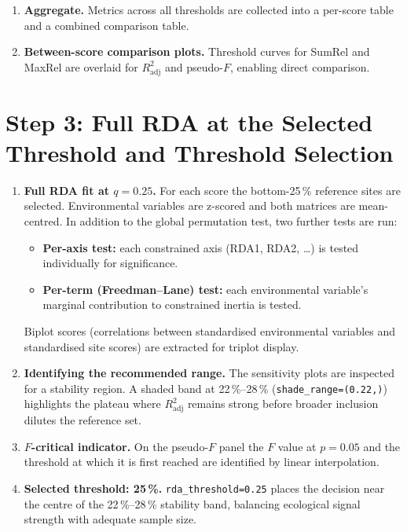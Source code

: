 \documentclass[11pt]{article}
\begin{document}
\begin{enumerate}[leftmargin=*]
\begin{enumerate}[label=(\alph*)]
      \item \textbf{Record metrics.}
        $R^2$, $R^2_{\mathrm{adj}}$, pseudo-$F$, $p$-value,
        constrained inertia, total inertia, RDA1 eigenvalue, $n$ sites.
    \end{enumerate}

  \item \textbf{Aggregate.}
    Metrics across all thresholds are collected into a per-score
    table and a combined comparison table.

  \item \textbf{Between-score comparison plots.}
    Threshold curves for SumRel and MaxRel are overlaid for
    $R^2_{\mathrm{adj}}$ and pseudo-$F$, enabling direct comparison.
\end{enumerate}

\section{Step 3: Full RDA at the Selected Threshold and
         Threshold Selection}

\begin{enumerate}[leftmargin=*]
  \item \textbf{Full RDA fit at $q = 0.25$.}
    For each score the bottom-25\,\% reference sites are selected.
    Environmental variables are z-scored and both matrices are
    mean-centred.
    In addition to the global permutation test, two further tests are
    run:
    \begin{itemize}
      \item \textbf{Per-axis test:} each constrained axis (RDA1, RDA2,
        \ldots) is tested individually for significance.
      \item \textbf{Per-term (Freedman--Lane) test:} each environmental
        variable's marginal contribution to constrained inertia is
        tested.
    \end{itemize}
    Biplot scores (correlations between standardised environmental
    variables and standardised site scores) are extracted for triplot
    display.

  \item \textbf{Identifying the recommended range.}
    The sensitivity plots are inspected for a stability region.
    A shaded band at 22\,\%--28\,\%
    (\texttt{shade\_range=(0.22,)}) highlights the plateau where
    $R^2_{\mathrm{adj}}$ remains strong before broader inclusion
    dilutes the reference set.

  \item \textbf{$F$-critical indicator.}
    On the pseudo-$F$ panel the $F$ value at $p = 0.05$ and the
    threshold at which it is first reached are identified by linear
    interpolation.

  \item \textbf{Selected threshold: 25\,\%.}
    \texttt{rda\_threshold=0.25} places the decision near the centre
    of the 22\,\%--28\,\% stability band, balancing ecological signal
    strength with adequate sample size.
\end{enumerate}
\end{document}
